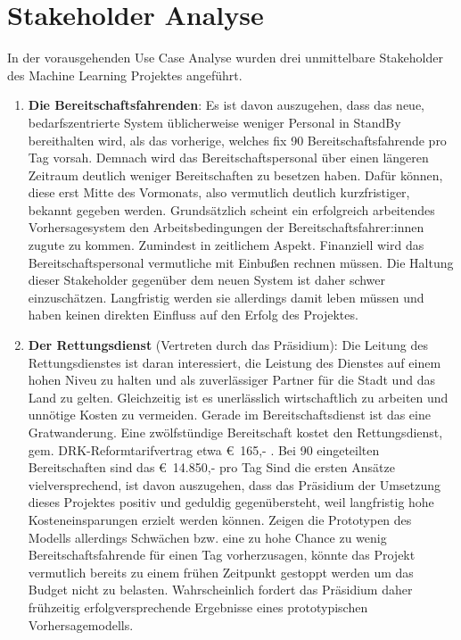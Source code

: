 \chapter{Stakeholder Analyse}

In der vorausgehenden Use Case Analyse \citep{grunsky_rettungsdienst_2024} wurden drei unmittelbare Stakeholder des Machine Learning Projektes angeführt.

\begin{enumerate}
	\item \textbf{Die Bereitschaftsfahrenden}: Es ist davon auszugehen, dass das neue, bedarfszentrierte System üblicherweise weniger Personal in StandBy bereithalten wird, als das vorherige, welches fix 90 Bereitschaftsfahrende pro Tag vorsah. Demnach wird das Bereitschaftspersonal über einen längeren Zeitraum deutlich weniger Bereitschaften zu besetzen haben. Dafür können, diese erst Mitte des Vormonats, also vermutlich deutlich kurzfristiger, bekannt gegeben werden. Grundsätzlich scheint ein erfolgreich arbeitendes Vorhersagesystem den Arbeitsbedingungen der Bereitschaftsfahrer:innen zugute zu kommen. Zumindest in zeitlichem Aspekt. Finanziell wird das Bereitschaftspersonal vermutliche mit Einbußen rechnen müssen. Die Haltung dieser Stakeholder gegenüber dem neuen System ist daher schwer einzuschätzen. Langfristig werden sie allerdings damit leben müssen und haben keinen direkten Einfluss auf den Erfolg des Projektes.
	\item \textbf{Der Rettungsdienst} (Vertreten durch das Präsidium): Die Leitung des Rettungsdienstes ist daran interessiert, die Leistung des Dienstes auf einem hohen Niveu zu halten und als zuverlässiger Partner für die Stadt und das Land zu gelten. Gleichzeitig ist es unerlässlich wirtschaftlich zu arbeiten und unnötige Kosten zu vermeiden. Gerade im Bereitschaftsdienst ist das eine Gratwanderung. Eine zwölfstündige Bereitschaft kostet den Rettungsdienst, gem. DRK-Reformtarifvertrag etwa  €~165,- \citep{deutsches_rotes_kreuz_drk-reformtarifvertrag_2023}. Bei 90 eingeteilten Bereitschaften sind das €~14.850,- pro Tag Sind die ersten Ansätze vielversprechend, ist davon auszugehen, dass das Präsidium der Umsetzung dieses Projektes positiv und geduldig gegenübersteht, weil langfristig hohe Kosteneinsparungen erzielt werden können. Zeigen die Prototypen des Modells allerdings Schwächen bzw. eine zu hohe Chance zu wenig Bereitschaftsfahrende für einen Tag vorherzusagen, könnte das Projekt vermutlich bereits zu einem frühen Zeitpunkt gestoppt werden um das Budget nicht zu belasten. Wahrscheinlich fordert das Präsidium daher frühzeitig erfolgversprechende Ergebnisse eines prototypischen Vorhersagemodells.

\end{enumerate}
